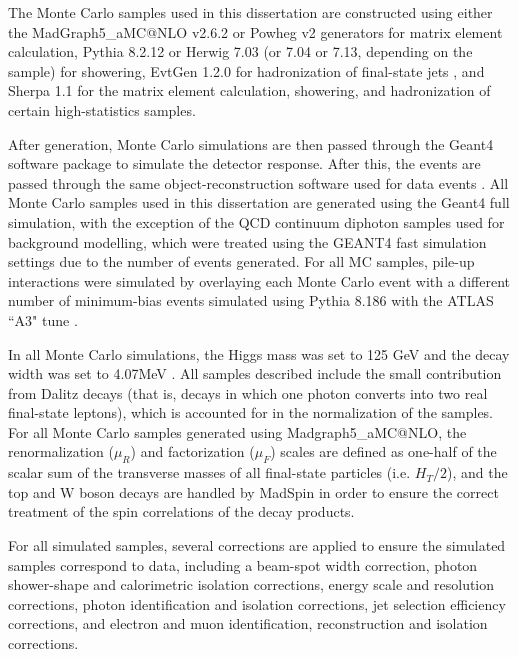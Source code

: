 \begin{sloppypar}
The Monte Carlo samples used in this dissertation are constructed using either the {MadGraph5\_aMC@NLO} v2.6.2 \cite{MG5} or Powheg v2 \cite{Powheg} \cite{PowhegBox} generators for matrix element calculation, Pythia 8.2.12 \cite{Pythia8.1} \cite{Pythia8.2} or Herwig 7.03 (or 7.04 or 7.13, depending on the sample) \cite{Herwig} \cite{Herwig7} \cite{Herwig7.1} for showering, EvtGen 1.2.0 for hadronization of final-state jets \cite{EvGen}, and Sherpa 1.1 \cite{Sherpa1} \cite{Sherpa2} \cite{Comix} for the matrix element calculation, showering, and hadronization of certain high-statistics samples.
\end{sloppypar}

After generation, Monte Carlo simulations are then passed through the Geant4 software package \cite{GEANT4} to simulate the detector response. After this, the events are passed through the same object-reconstruction software used for data events \cite{Aad_2010}. All Monte Carlo samples used in this dissertation are generated using the Geant4 full simulation, with the exception of the QCD continuum diphoton samples used for background modelling, which were treated using the GEANT4 fast simulation settings due to the number of events generated. For all MC samples, pile-up interactions were simulated by overlaying each Monte Carlo event with a different number of minimum-bias events simulated using Pythia 8.186 \cite{Pythia8.1} with the ATLAS ``A3" tune \cite{A3}.

In all Monte Carlo simulations, the Higgs mass was set to 125 GeV and the decay width was set to 4.07MeV \cite{YellowReport4}. All samples described include the small contribution from Dalitz decays (that is, decays in which one photon converts into two real final-state leptons), which is accounted for in the normalization of the samples. For all Monte Carlo samples generated using {Madgraph5\_aMC@NLO}, the renormalization ($\mu_{R}$) and factorization ($\mu_{F}$) scales are defined as one-half of the scalar sum of the transverse masses of all final-state particles (i.e. $H_{T}/2$), and the top and W boson decays are handled by MadSpin \cite{MadSpin} in order to ensure the correct treatment of the spin correlations of the decay products.

For all simulated samples, several corrections are applied to ensure the simulated samples correspond to data, including a beam-spot width correction, photon shower-shape and calorimetric isolation corrections, energy scale and resolution corrections, photon identification and isolation corrections, jet selection efficiency corrections, and electron and muon identification, reconstruction and isolation corrections.


